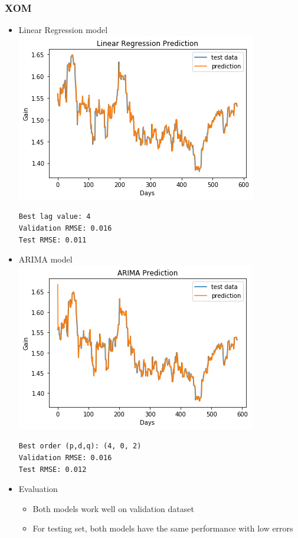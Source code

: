 \documentclass[11pt]{article}
\makeatletter
\def\maxwidth{\ifdim\Gin@nat@width>\linewidth\linewidth
    \else\Gin@nat@width\fi}
\let\Oldincludegraphics\includegraphics
\renewcommand{\includegraphics}[1]{\Oldincludegraphics[width=.8\maxwidth]{#1}}
\providecommand{\tightlist}{%
      \setlength{\itemsep}{0pt}\setlength{\parskip}{0pt}}
\makeatother
\begin{document}
\subsubsection{XOM}\label{xom}

\begin{itemize}
\item
  Linear Regression model \\
  \includegraphics{./figures/26.jpg}

\begin{verbatim}
Best lag value: 4
Validation RMSE: 0.016
Test RMSE: 0.011
\end{verbatim}
\item
  ARIMA model \\
  \includegraphics{./figures/27.jpg}

\begin{verbatim}
Best order (p,d,q): (4, 0, 2)
Validation RMSE: 0.016
Test RMSE: 0.012
\end{verbatim}
\item
  Evaluation

  \begin{itemize}
  \tightlist
  \item
    Both models work well on validation dataset
  \item
    For testing set, both models have the same performance with low
    errors
  \end{itemize}
\end{itemize}
\end{document}
